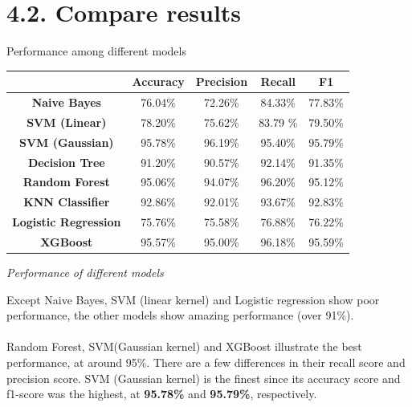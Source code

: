 \documentclass[a4paper]{report}
\begin{document}
	\pagebreak
	
	\section*{\Large 4.2. Compare results}
	Performance among different models
	
	\renewcommand{\arraystretch}{1.5} %
	
	\begin{tabular}{|c|c|c|c|c|}
		\toprule
		& \textbf{Accuracy} & \textbf{Precision} & \textbf{Recall} & \textbf{F1} \\
		\hline
		\textbf{Naive Bayes} & 76.04\% & 72.26\% & 84.33\% & 77.83\% \\
		\textbf{SVM (Linear)}   & 78.20\% & 75.62\% & 83.79 \% & 79.50\% \\
		\textbf{SVM (Gaussian)}  & 95.78\% & 96.19\% & 95.40\% & 95.79\% \\
		\textbf{Decision Tree}    & 91.20\% & 90.57\% & 92.14\% & 91.35\% \\
		\textbf{Random Forest}    & 95.06\% & 94.07\% & 96.20\% & 95.12\% \\
		\textbf{KNN Classifier}    & 92.86\% & 92.01\% & 93.67\% & 92.83\% \\
		\textbf{Logistic Regression}    & 75.76\% & 75.58\% & 76.88\% & 76.22\% \\
		\textbf{XGBoost}    & 95.57\% & 95.00\% & 96.18\% & 95.59\% \\
		\bottomrule
	\end{tabular}
	\begin{center}
		\textit{Performance of different models}
	\end{center}
	Except Naive Bayes, SVM (linear kernel) and Logistic regression show poor performance, the other models show amazing performance (over 91\%).
	
	\paragraph{}
	Random Forest, SVM(Gaussian kernel) and XGBoost illustrate the best performance, at around 95\%. There are a few differences in their recall score and precision score. SVM (Gaussian kernel) is the finest since its accuracy score and f1-score was the highest, at \textbf{95.78\%} and \textbf{95.79\%}, respectively.
	
	
\end{document}
